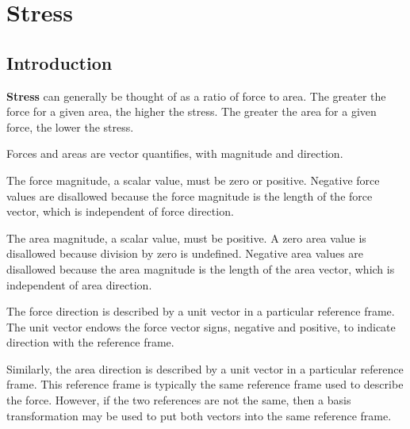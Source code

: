 \chapter{Stress}

\section{Introduction}
{\bf Stress} can generally be thought of as a ratio
of force to area.  The greater the force for a given area, the higher
the stress.  The greater the area for a given force, the lower the
stress.  

Forces and areas are vector quantifies, 
with magnitude and direction.  

The force magnitude, a scalar value, must be zero or positive.  
Negative force values are disallowed because the force magnitude
is the length of the force vector, 
which is independent of force direction.

The area magnitude, a scalar value, must be positive.
A zero area value is disallowed because division by zero is
undefined.  Negative area values are disallowed because the 
area magnitude is the length of the area vector, 
which is independent of area direction.  

The force direction is described by a unit vector in a particular
reference frame.  The unit vector endows 
the force vector signs, negative and positive, to indicate
direction with the reference frame.  

Similarly, the area direction is described by a unit vector
in a particular reference frame.  This reference frame is typically
the same reference frame used to describe the force.  However, if
the two references are not the same, then a basis transformation may
be used to put both vectors into the same reference frame. 

